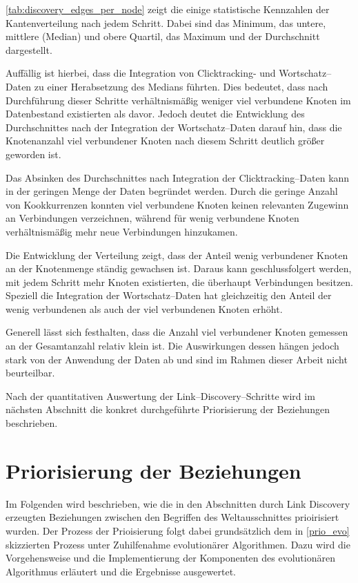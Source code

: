 \cref{tab:discovery_edges_per_node} zeigt die einige statistische Kennzahlen der Kantenverteilung nach jedem Schritt. Dabei sind das Minimum, das untere, mittlere (Median) und obere Quartil, das Maximum und der Durchschnitt dargestellt.

Auffällig ist hierbei, dass die Integration von Clicktracking- und Wortschatz--Daten zu einer Herabsetzung des Medians führten. Dies bedeutet, dass nach Durchführung dieser Schritte verhältnismäßig weniger viel verbundene Knoten im Datenbestand existierten als davor. Jedoch deutet die Entwicklung des Durchschnittes nach der Integration der Wortschatz--Daten darauf hin, dass die Knotenanzahl viel verbundener Knoten nach diesem Schritt deutlich größer geworden ist.

Das Absinken des Durchschnittes nach Integration der Clicktracking--Daten kann in der geringen Menge der Daten begründet werden. Durch die geringe Anzahl von Kookkurrenzen konnten viel verbundene Knoten keinen relevanten Zugewinn an Verbindungen verzeichnen, während für wenig verbundene Knoten verhältnismäßig mehr neue Verbindungen hinzukamen.

Die Entwicklung der Verteilung zeigt, dass der Anteil wenig verbundener Knoten an der Knotenmenge ständig gewachsen ist. Daraus kann geschlussfolgert werden, mit jedem Schritt mehr Knoten existierten, die überhaupt Verbindungen besitzen. Speziell die Integration der Wortschatz--Daten hat gleichzeitig den Anteil der wenig verbundenen als auch der viel verbundenen Knoten erhöht.

Generell lässt sich festhalten, dass die Anzahl viel verbundener Knoten gemessen an der Gesamtanzahl relativ klein ist. Die Auswirkungen dessen hängen jedoch stark von der Anwendung der Daten ab und sind im Rahmen dieser Arbeit nicht beurteilbar.

Nach der quantitativen Auswertung der Link--Discovery--Schritte wird im nächsten Abschnitt die konkret durchgeführte Priorisierung der Beziehungen beschrieben.

\section{Priorisierung der Beziehungen}

Im Folgenden wird beschrieben, wie die in den Abschnitten  durch Link Discovery erzeugten Beziehungen zwischen den Begriffen des Weltausschnittes prioirisiert wurden. Der Prozess der Prioisierung folgt dabei grundsätzlich dem in \cref{prio_evo} skizzierten Prozess unter Zuhilfenahme evolutionärer Algorithmen. Dazu wird die Vorgehensweise und die Implementierung der Komponenten des evolutionären Algorithmus erläutert und die Ergebnisse ausgewertet.

